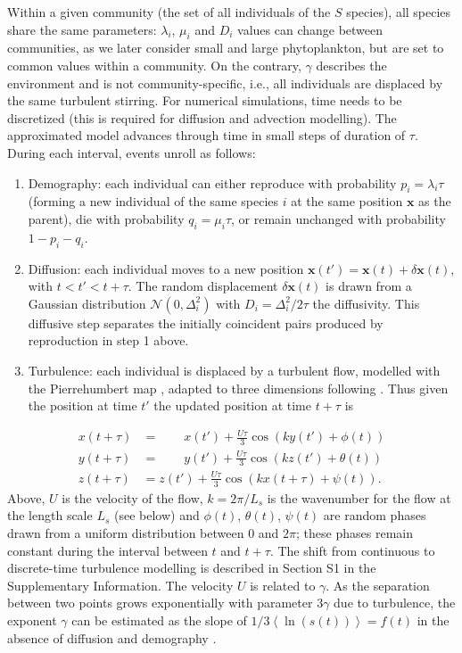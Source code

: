 \documentclass[12pt,english]{article}
\begin{document}
Within a given community (the set of all individuals of the $S$ species),
all species share the same parameters: $\lambda_{i}$, $\mu_{i}$
and $D_{i}$ values can change between communities, as we later consider
small and large phytoplankton, but are set to common values within
a community. On the contrary, $\gamma$ describes the environment
and is not community-specific, i.e., all individuals are displaced
by the same turbulent stirring. For numerical simulations, time needs
to be discretized (this is required for diffusion and advection modelling).
The approximated model advances through time in small steps of duration
of $\tau$. During each interval, events unroll as follows:
\begin{enumerate}
\item Demography: each individual can either reproduce with probability
$p_{i}=\lambda_{i}\tau$ (forming a new individual of the same species
$i$ at the same position $\mathbf{x}$ as the parent), die with probability
$q_{i}=\mu_{i}\tau$, or remain unchanged with probability $1-p_{i}-q_{i}$.
\item Diffusion: each individual moves to a new position $\mathbf{x}(t')=\mathbf{x}(t)+\delta\mathbf{x}(t)$,
with $t<t'<t+\tau$. The random displacement $\delta\mathbf{x}(t)$
is drawn from a Gaussian distribution $\mathcal{N}(0,\Delta_{i}^{2})$
with $D_{i}=\Delta_{i}^{2}/2\tau$ the diffusivity. This diffusive
step separates the initially coincident pairs produced by reproduction
in step 1 above.
\item Turbulence: each individual is displaced by a turbulent flow, modelled
with the Pierrehumbert map \citep{pierrehumbert_tracer_1994}, adapted
to three dimensions following \citet{ngan_scalar_2011}. Thus given
the position at time $t'$ the updated position at time $t+\tau$
is
\end{enumerate}
\begin{equation}
\begin{array}{cc}
x(t+\tau) & =\qquad x(t')+\frac{U\tau}{3}\cos\left(ky(t')+\phi(t)\right)\\
y(t+\tau) & =\qquad y(t')+\frac{U\tau}{3}\cos\left(kz(t')+\theta(t)\right)\\
z(t+\tau) & =z(t')+\frac{U\tau}{3}\cos\left(kx(t+\tau)+\psi(t)\right).
\end{array}
\end{equation}
Above, $U$ is the velocity of the flow, $k=2\pi/L_{s}$ is the wavenumber
for the flow at the length scale $L_{s}$ (see below) and $\phi(t)$,
$\theta(t)$, $\psi(t)$ are random phases drawn from a uniform distribution
between $0$ and $2\pi$; these phases remain constant during the
interval between $t$ and $t+\tau$. The shift from continuous to
discrete-time turbulence modelling is described in Section S1 in the
Supplementary Information. The velocity $U$ is related to $\gamma$.
As the separation between two points grows exponentially with parameter
$3\gamma$ due to turbulence, the exponent $\gamma$ can be estimated
as the slope of $1/3\left\langle \ln(s(t))\right\rangle =f(t)$ in
the absence of diffusion and demography \citep{young_reproductive_2001,picoche_rescience_2022}.
\end{document}
